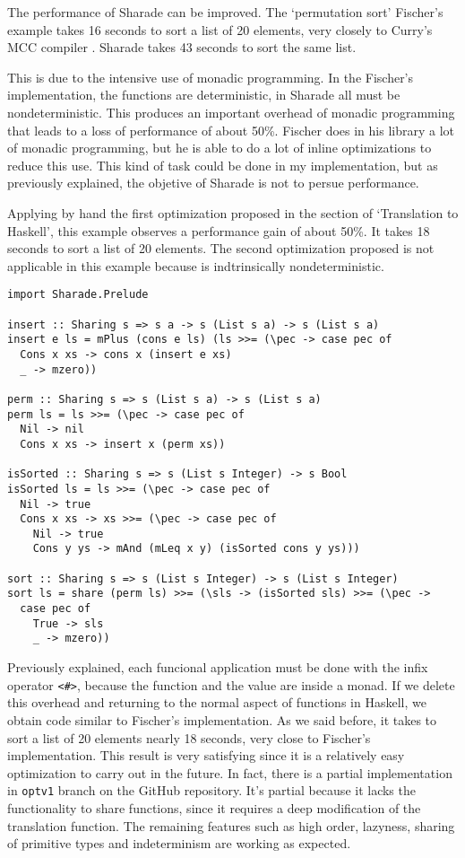 \documentclass[class=article, crop=false]{standalone}
\begin{document}
The performance of Sharade can be improved. The `permutation sort' Fischer's example takes
16 seconds to sort a list of 20 elements, very closely to Curry's MCC
compiler \cite{lux2003munster}. Sharade takes 43 seconds to sort the same list.

This is due to the intensive use of monadic programming. In the Fischer's implementation, the
functions are deterministic, in Sharade all must be nondeterministic. This produces an
important overhead of monadic programming that leads to a loss of performance of about 50\%.
Fischer does in his library a lot of monadic programming, but he is able to do a lot of
inline optimizations to reduce this use. This kind of task could be done in my
implementation, but as previously explained, the objetive of Sharade is not to persue
performance.

Applying by hand the first optimization proposed in the section of `Translation to Haskell',
this example observes a performance gain of about 50\%. It takes 18 seconds to sort a list of
20 elements. The second optimization proposed is not applicable in this example because is
indtrinsically nondeterministic.

\begin{verbatim}
import Sharade.Prelude

insert :: Sharing s => s a -> s (List s a) -> s (List s a)
insert e ls = mPlus (cons e ls) (ls >>= (\pec -> case pec of
  Cons x xs -> cons x (insert e xs)
  _ -> mzero))

perm :: Sharing s => s (List s a) -> s (List s a)
perm ls = ls >>= (\pec -> case pec of
  Nil -> nil
  Cons x xs -> insert x (perm xs))

isSorted :: Sharing s => s (List s Integer) -> s Bool
isSorted ls = ls >>= (\pec -> case pec of
  Nil -> true
  Cons x xs -> xs >>= (\pec -> case pec of
    Nil -> true
    Cons y ys -> mAnd (mLeq x y) (isSorted cons y ys)))

sort :: Sharing s => s (List s Integer) -> s (List s Integer)
sort ls = share (perm ls) >>= (\sls -> (isSorted sls) >>= (\pec ->
  case pec of
    True -> sls
    _ -> mzero))
\end{verbatim}

Previously explained, each funcional application must be done with the infix operator
\verb`<#>`, because the function and the value are inside a monad. If we delete this overhead
and returning to the normal aspect of functions in Haskell, we obtain code similar to
Fischer's implementation. As we said before, it takes to sort a list of 20 elements nearly
18 seconds, very close to Fischer's implementation. This result is very satisfying since it
is a relatively easy optimization to carry out in the future. In fact, there is a partial
implementation in \verb`optv1` branch on the GitHub repository. It's partial because it lacks
the functionality to share functions, since it requires a deep modification of the
translation function. The remaining features such as high order, lazyness, sharing of
primitive types and indeterminism are working as expected.
\end{document}
